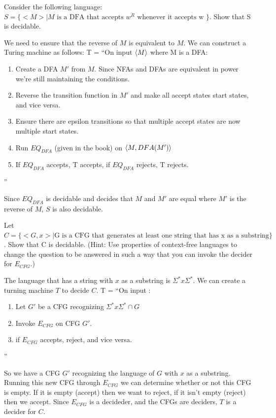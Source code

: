 \begin{problem}{3}
  Consider the following language: $S = \{<M> | M \text{ is a DFA that accepts } w^R \text{ whenever it accepts w }\}$. Show that S is
  decidable.
  \begin{solution}
    We need to ensure that the reverse of $M$ is equivalent to $M$. We can construct a Turing machine as follows:
    T = ``On input $\left \langle M \right \rangle $ where M is a DFA:
    \begin{enumerate}
      \item Create a DFA $M'$ from $M$. Since NFAs and DFAs are equivalent in power we're still maintaining the conditions.\\
      \item Reverse the transition function in $M'$ and make all accept states start states, and vice versa.\\
      \item Ensure there are epsilon transitions so that multiple accept states are now multiple start states.\\
      \item Run $EQ_{DFA}$ (given in the book) on $\left \langle M, DFA(M') \right \rangle $\\
      \item If $EQ_{DFA}$ accepts, T accepts, if $EQ_{DFA}$ rejects, T rejects.\\
    \end{enumerate}
    ''

    \noindent Since $EQ_{DFA}$ is decidable and decides that $M$ and $M'$ are equal where $M'$ is the reverse of $M$, $S$ is also
    decidable.
  \end{solution}
\end{problem}

\begin{problem}{4}
  Let $C = \{<G,x> | \text{G is a CFG that generates at least one string that has x as a substring}\}$. Show that C is decidable.
  (Hint: Use properties of context-free languages to change the question to be answered in such a way that you can
  invoke the decider for $E_{CFG}$.)
  \begin{solution}
    The language that has a string with $x$ as a substring is $\Sigma^*x\Sigma^*$.
    We can create a turning machine $T$ to decide $C$.
    T = ``On input :
    \begin{enumerate}
      \item Let $G'$ be a CFG recognizing $\Sigma^*x\Sigma^* \cap G$\\
      \item Invoke $E_{CFG}$ on CFG $G'$.\\
      \item if $E_{CFG}$ accepts, reject, and vice versa.
    \end{enumerate}
    ''
  \end{solution}
  So we have a CFG $G'$ recognizing the language of $G$ with $x$ as a substring. Running this new CFG through $E_{CFG}$ we
  can determine whether or not this CFG is empty. If it is empty (accept) then we want to reject, if it isn't empty
  (reject) then we accept.  Since $E_{CFG}$ is a decideder, and the CFGs are deciders, $T$ is a decider for $C$.
\end{problem}

